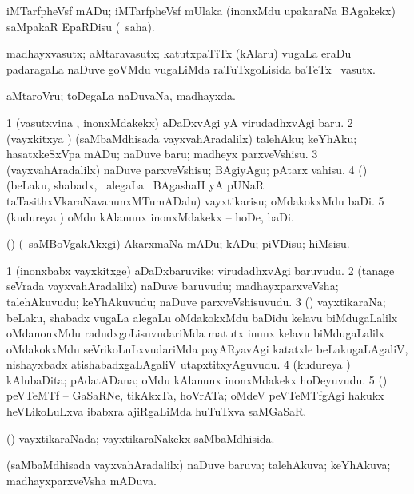 \bentry
{}
\gl{\sakirx}
\bmng
iMTarfpheVsf mADu; iMTarfpheVsf mUlaka (inonxMdu upakaraNa BAgakekx) saMpakaR EpaRDisu (\akirx\ saha). 
\emng
\eentry

\bentry
{}
\gl{\nA}
\bmng
madhayxvasutx; aMtaravasutx; katutxpaTiTx (kAlaru) \mo vugaLa eraDu padaragaLa naDuve goVMdu \mo vugaLiMda raTuTxgoLisida baTeTx \mo\ vasutx. 
\emng
\eentry

\bentry
{}
\gl{\gu}
\bmng
aMtaroVru; toDegaLa naDuvaNa, madhayxda. 
\emng
\eentry

\bentry
{}
\gl{\akirx}
\bmng
\bnum
\num{1} (vasutxvina \vi, inonxMdakekx) aDaDxvAgi yA virudadhxvAgi baru. 
\num{2} (vayxkitxya \vi) (saMbaMdhisada vayxvahAradalilx) talehAku; keYhAku; hasatxkeSxVpa mADu; naDuve baru; madheyx parxveVshisu. 
\num{3} (vayxvahAradalilx) naDuve parxveVshisu; BAgiyAgu; pAtarx vahisu. 
\num{4} (\Bwvi) (beLaku, shabadx, \mo\ alegaLa \vi\ BAgashaH yA pUNaR taTasithxVkaraNavanunxMTumADalu) vayxtikarisu; oMdakokxMdu baDi. 
\num{5} (kudureya \vi) oMdu kAlanunx inonxMdakekx -- hoDe, baDi. 
\enum
\emng

\noindent 
\gl{\pagu}
\bmng
{} (\sw) (\kanmu\ saMBoVgakAkxgi) AkarxmaNa mADu; kADu; piVDisu; hiMsisu. 
\emng
\eentry

\bentry
{}
\gl{\nA}
\bmng
\bnum
\num{1} (inonxbabx vayxkitxge) aDaDxbaruvike; virudadhxvAgi baruvudu. 
\num{2} (tanage seVrada vayxvahAradalilx) naDuve baruvudu; madhayxparxveVsha; talehAkuvudu; keYhAkuvudu; naDuve parxveVshisuvudu. 
\num{3} (\Bwvi) vayxtikaraNa; beLaku, shabadx \mo vugaLa alegaLu oMdakokxMdu baDidu kelavu biMdugaLalilx oMdanonxMdu radudxgoLisuvudariMda matutx inunx kelavu biMdugaLalilx oMdakokxMdu seVrikoLuLxvudariMda payARyavAgi katatxle beLakugaLAgaliV, nishayxbadx atishabadxgaLAgaliV utapxtitxyAguvudu. 
\num{4} (kudureya \vi) kAlubaDita; pAdatADana; oMdu kAlanunx inonxMdakekx hoDeyuvudu. 
\num{5} (\ame) peVTeMTf -- GaSaRNe, tikAkxTa, hoVrATa; oMdeV peVTeMTfgAgi hakukx heVLikoLuLxva ibabxra ajiRgaLiMda huTuTxva saMGaSaR. 
\enum
\emng
\eentry

\bentry
{}
\gl{\gu}
\bmng
(\Bwvi) vayxtikaraNada; vayxtikaraNakekx saMbaMdhisida. 
\emng
\eentry

\bentry
{}
\gl{\gu}
\bmng
(saMbaMdhisada vayxvahAradalilx) naDuve baruva; talehAkuva; keYhAkuva; madhayxparxveVsha mADuva. 
\emng
\eentry

